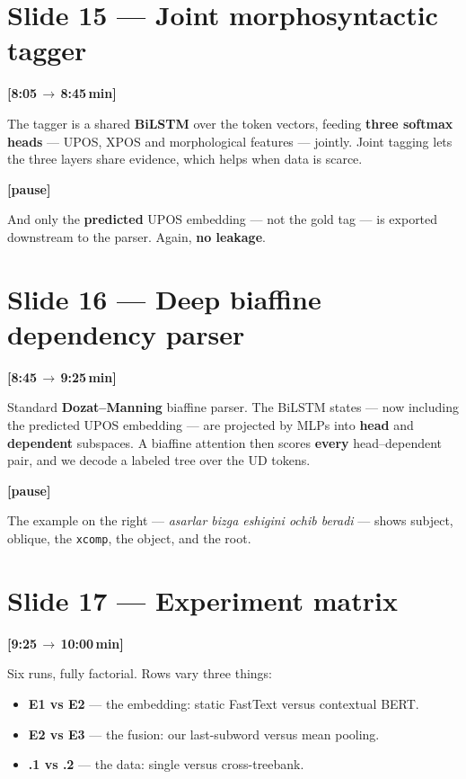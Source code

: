 \documentclass[12pt,a4paper]{article}
\newcommand{\timing}[2]{%
   \par\noindent\textbf{\small [#1\,$\to$\,#2\,min]}\par\vspace{0.2em}}
\newcommand{\say}[1]{\textbf{#1}}
\newcommand{\pause}{\par\vspace{0.4em}\textbf{[pause]}\par}
\begin{document}
\section*{Slide 15 --- Joint morphosyntactic tagger}
\timing{8:05}{8:45}

The tagger is a shared \textbf{BiLSTM} over the token vectors, feeding
\textbf{three softmax heads} --- UPOS, XPOS and morphological features ---
jointly. Joint tagging lets the three layers share evidence, which helps
when data is scarce.

\pause

And only the \say{predicted} UPOS embedding --- not the gold tag --- is
exported downstream to the parser. Again, \say{no leakage}.

\section*{Slide 16 --- Deep biaffine dependency parser}
\timing{8:45}{9:25}

Standard \textbf{Dozat--Manning} biaffine parser. The BiLSTM states ---
now including the predicted UPOS embedding --- are projected by MLPs into
\textbf{head} and \textbf{dependent} subspaces. A biaffine attention then
scores \say{every} head--dependent pair, and we decode a labeled tree
over the UD tokens.

\pause

The example on the right --- \textit{asarlar bizga eshigini ochib
beradi} --- shows subject, oblique, the \texttt{xcomp}, the object, and the
root.

\section*{Slide 17 --- Experiment matrix}
\timing{9:25}{10:00}

Six runs, fully factorial. Rows vary three things:

\begin{itemize}
   \item \textbf{E1 vs E2} --- the embedding: static FastText versus contextual BERT.
   \item \textbf{E2 vs E3} --- the fusion: our last-subword versus mean pooling.
   \item \textbf{.1 vs .2} --- the data: single versus cross-treebank.
\end{itemize}
\end{document}
